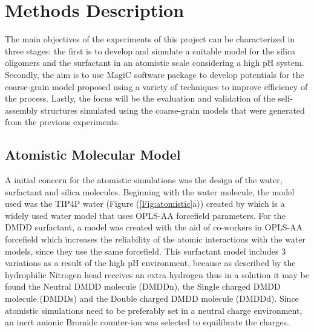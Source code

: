 \documentclass[10pt,a4paper,twoside]{article}
\begin{document}
\section{Methods Description} 

The main objectives of the experiments of this project can be characterized in three stages: the first is to develop and simulate a suitable model for the silica oligomers and the surfactant in an atomistic scale considering a high pH system. Secondly, the aim is to use MagiC software package to develop potentials for the coarse-grain model proposed using a variety of techniques to improve efficiency of the process. Lastly, the focus will be the evaluation and validation of the self-assembly structures simulated using the coarse-grain models that were generated from the previous experiments.

\subsection{Atomistic Molecular Model}

 A initial concern for the atomistic simulations was the design of the water, surfactant and silica molecules. Beginning with the water molecule, the model used was the TIP4P water (Figure (\ref{Fig:atomistic}a)) created by \cite{tip4p} which is a widely used water model that uses OPLS-AA forcefield \cite{opls} parameters. For the DMDD surfactant, a model was created with the aid of co-workers in OPLS-AA forcefield which increases the reliability of the atomic interactions with the water models, since they use the same forcefield. This surfactant model includes 3 variations as a result of the high pH environment, because as described by \cite{hheads} the hydrophilic Nitrogen head receives an extra hydrogen thus in a solution it may be found the Neutral DMDD molecule (DMDDn), the Single charged DMDD molecule (DMDDs) and the Double charged DMDD molecule (DMDDd). Since atomistic simulations need to be preferably set in a neutral charge environment, an inert anionic Bromide counter-ion was selected to equilibrate the charges.
 
\end{document}
